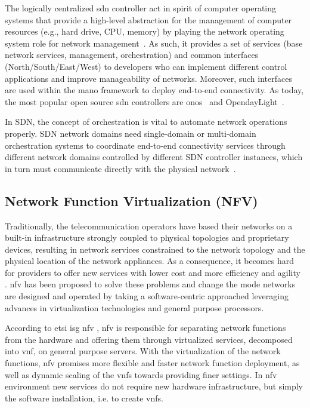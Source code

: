 The logically centralized \gls{sdn} controller act in spirit of computer operating systems that provide a high-level abstraction for the management of computer resources (e.g., hard drive, CPU, memory) by playing the network operating system role for network management~\cite{gude2008nox}. As such, it provides a set of services (base network services, management, orchestration) and common interfaces (North/South/East/West) to developers who can implement different control applications and improve manageability of networks. Moreover, such interfaces are used within the \gls{mano} framework to deploy end-to-end connectivity. As today, the most popular open source \gls{sdn} controllers are \gls{onos}~\cite{ON.LABONOSScale-out.} and OpendayLight~\cite{LinuxFoundationOpenDaylight}.

In SDN, the concept of orchestration is vital to automate network operations properly. SDN network domains need single-domain or multi-domain orchestration systems to coordinate end-to-end connectivity services through different network domains controlled by different SDN controller instances, which in turn must communicate directly with the physical network~\cite{SDNevolution}.

\subsection{Network Function Virtualization (NFV)}

Traditionally, the telecommunication operators have based their networks on a built-in infrastructure strongly coupled to physical topologies and proprietary devices, resulting in network services constrained to the network topology and the physical location of the network appliances. As a consequence, it becomes hard for providers to offer new services with lower cost and more efficiency and agility \cite{Mijumbi2016NetworkChallenges}. \acrlong{nfv} has been proposed to solve these problems \cite{ETSI2012NetworkAction} and change the mode networks are designed and operated by taking a software-centric approached leveraging advances in virtualization technologies and general purpose processors.

According to \gls{etsi} \gls{isg} \gls{nfv} \cite{ETSIIndustrySpecificationGroupISGNFV2014NetworkNFV},  \acrlong{nfv} is responsible for separating network functions from the hardware and offering them through virtualized services, decomposed into \gls{vnf}, on general purpose servers. With the virtualization of the network functions, \gls{nfv} promises more flexible and faster network function deployment, as well as dynamic scaling of the \glspl{vnf} towards providing finer settings. In \gls{nfv} environment new services do not require new hardware infrastructure, but simply the software installation, i.e. to create \glspl{vnf}.

